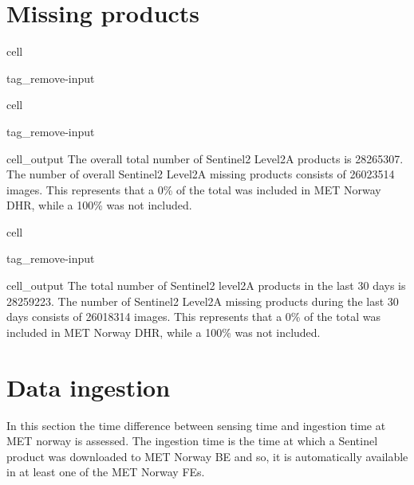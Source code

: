 \documentclass[letterpaper,10pt,english]{jupyterBook}
\begin{document}
\section{Missing products}
\label{\detokenize{S2L2A_portals:missing-products}}
\begin{sphinxuseclass}{cell}
\begin{sphinxuseclass}{tag_remove-input}
\end{sphinxuseclass}
\end{sphinxuseclass}
\begin{sphinxuseclass}{cell}
\begin{sphinxuseclass}{tag_remove-input}\begin{sphinxVerbatimOutput}

\begin{sphinxuseclass}{cell_output}
\sphinxAtStartPar
The overall total number of Sentinel\sphinxhyphen{}2 Level\sphinxhyphen{}2A products is 28265307. The number of overall Sentinel\sphinxhyphen{}2 Level\sphinxhyphen{}2A missing products consists of 26023514 images. This represents that a 0\% of the total was included in MET Norway DHR, while a 100\% was not included.

\end{sphinxuseclass}\end{sphinxVerbatimOutput}

\end{sphinxuseclass}
\end{sphinxuseclass}
\begin{sphinxuseclass}{cell}
\begin{sphinxuseclass}{tag_remove-input}\begin{sphinxVerbatimOutput}

\begin{sphinxuseclass}{cell_output}
\sphinxAtStartPar
The total number of Sentinel\sphinxhyphen{}2 level\sphinxhyphen{}2A products in the last 30 days is 28259223. The number of Sentinel\sphinxhyphen{}2 Level\sphinxhyphen{}2A missing products during the last 30 days consists of 26018314 images. This represents that a 0\% of the total was included in MET Norway DHR, while a 100\% was not included.

\end{sphinxuseclass}\end{sphinxVerbatimOutput}

\end{sphinxuseclass}
\end{sphinxuseclass}

\section{Data ingestion}
\label{\detokenize{S2L2A_portals:data-ingestion}}
\sphinxAtStartPar
In this section the time difference between sensing time and ingestion time at MET norway is assessed. The ingestion time is the time at which a Sentinel product was downloaded to MET Norway BE and so, it is automatically available in at least one of the MET Norway FEs.
\end{document}
